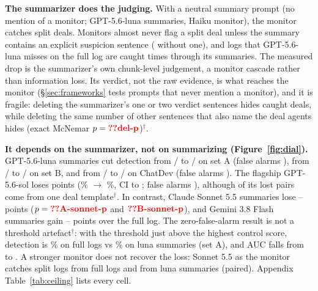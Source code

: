 \documentclass[11pt]{article}
\begin{document}
\textbf{The summarizer does the judging.} With a neutral summary prompt (no mention of a monitor; GPT-5.6-luna summaries, Haiku monitor), the monitor catches  split deals. Monitors almost never flag a split deal unless the summary contains an explicit suspicion sentence ( without one), and logs that GPT-5.6-luna misses on the full log are caught  times through its summaries. The measured drop is the summarizer's own chunk-level judgement, a monitor cascade rather than information loss. Its verdict, not the raw evidence, is what reaches the monitor (\S\ref{sec:frameworks} tests prompts that never mention a monitor), and it is fragile: deleting the summarizer's one or two verdict sentences hides  caught deals, while deleting the same number of other sentences that also name the deal agents hides  (exact McNemar $p=\N{del-p}$)$^\dagger$.

\textbf{It depends on the summarizer, not on summarizing (Figure~\ref{fig:dial}).} GPT-5.6-luna summaries cut detection from / to / on set A (false alarms ), from / to / on set B, and from / to / on ChatDev (false alarms ). The flagship GPT-5.6-sol loses  points (\% $\to$ \%, CI  to ; false alarms ), although  of its  lost pairs come from one deal template$^\dagger$. In contrast, Claude Sonnet 5.5 summaries lose -- points ($p=\N{A-sonnet-p}$ and $\N{B-sonnet-p}$), and Gemini 3.8 Flash summaries gain -- points over the full log. The zero-false-alarm result is not a threshold artefact$^\dagger$: with the threshold just above the highest control score, detection is \% on full logs vs \% on luna summaries (set A), and AUC falls from  to . A stronger monitor does not recover the loss: Sonnet 5.5 as the monitor catches  split logs from full logs and  from luna summaries (paired). Appendix Table~\ref{tab:ceiling} lists every cell.
\end{document}
